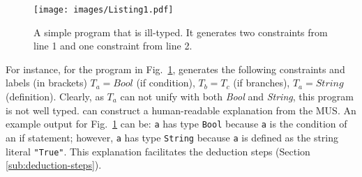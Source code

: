 

\begin{figure}[ht]
    \centering
\texttt{[image: images/Listing1.pdf]}
    \caption[An example to illustrate constraint generation in \chameleon{}]{A simple program that is ill-typed. It generates two constraints from line 1 and one constraint from line 2. }
    \label{fig:listing1}
\end{figure}

For instance, for the program in Fig.~\ref{fig:listing1}, \chameleon{}  generates the following constraints and labels (in brackets) $T_a = Bool$ (if condition), $T_b = T_c$ (if branches), $T_a= String$  (definition). Clearly, as $T_a$ can not unify with both \textit{Bool} and \textit{String}, this program is not well typed. \chameleon{} can construct a human-readable explanation from the MUS. An example output for Fig.~\ref{fig:listing1} can be: \texttt{a} has type \texttt{Bool} because \texttt{a} is the condition of an if statement; however, \texttt{a} has type \texttt{String} because \texttt{a} is defined as the string literal \texttt{"True"}. This explanation facilitates the deduction steps (Section \ref{sub:deduction-steps}). 






